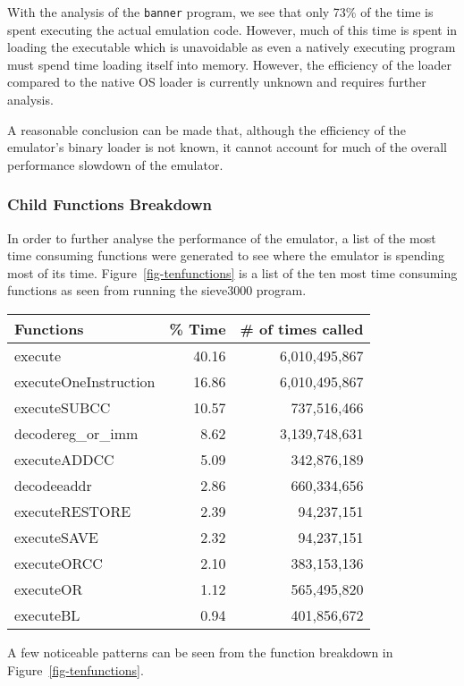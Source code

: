 With the analysis of the \verb!banner! program, we see that only 73\% of the 
time is spent executing the actual emulation code. However, much of this time 
is spent in loading the executable which is unavoidable as even a natively 
executing program must spend time loading itself into memory. However, the 
efficiency of the loader compared to the native OS loader is currently 
unknown and requires further analysis.

A reasonable conclusion can be made that, although the efficiency of the
emulator's binary loader is not known, it cannot account for much of the
overall performance slowdown of the emulator.


\subsubsection{Child Functions Breakdown}

In order to further analyse the performance of the emulator, a list of the 
most time consuming functions were generated to see where the emulator is 
spending most of its time. Figure~\ref{fig-tenfunctions} is a list of the ten 
most time consuming functions as seen from running the sieve3000 program.

\centerfigbegin
{
\begin{tabular}{|l|r|r|} \hline
Functions		& \% Time	& \# of times called\\ \hline
execute			& 40.16  	& 6,010,495,867 \\
executeOneInstruction	& 16.86 	& 6,010,495,867 \\
executeSUBCC		& 10.57		& 737,516,466  \\
decodereg\_or\_imm	& 8.62		& 3,139,748,631 \\
executeADDCC		& 5.09 		& 342,876,189 \\
decodeeaddr		& 2.86 		& 660,334,656 \\
executeRESTORE		& 2.39 		& 94,237,151\\
executeSAVE		& 2.32 		& 94,237,151\\
executeORCC		& 2.10  	& 383,153,136\\ 
executeOR		& 1.12 		& 565,495,820\\
executeBL		& 0.94 		& 401,856,672 \\
\hline
\end{tabular}
}

A few noticeable patterns can be seen from the function breakdown in 
Figure~\ref{fig-tenfunctions}.

